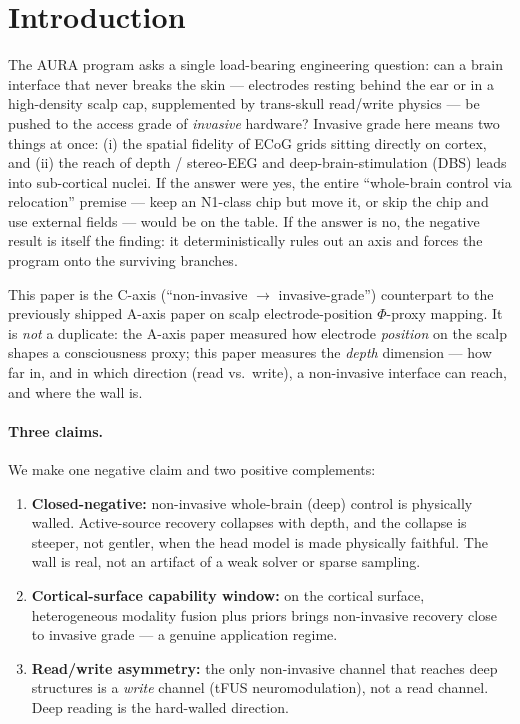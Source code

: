 \documentclass[11pt]{article}
\newcommand{\redbox}[1]{\textcolor{red!70!black}{\textbf{#1}}}
\newcommand{\greenbox}[1]{\textcolor{green!45!black}{\textbf{#1}}}
\begin{document}
\tableofcontents
\bigskip

\section{Introduction}
\label{sec:intro}

The AURA program asks a single load-bearing engineering question: can a brain
interface that never breaks the skin --- electrodes resting behind the ear or in a
high-density scalp cap, supplemented by trans-skull read/write physics --- be pushed
to the access grade of \emph{invasive} hardware? Invasive grade here means two
things at once: (i) the spatial fidelity of ECoG grids sitting directly on cortex,
and (ii) the reach of depth / stereo-EEG and deep-brain-stimulation (DBS) leads into
sub-cortical nuclei. If the answer were yes, the entire ``whole-brain control via
relocation'' premise --- keep an N1-class chip but move it, or skip the chip and use
external fields --- would be on the table. If the answer is no, the negative result
is itself the finding: it deterministically rules out an axis and forces the program
onto the surviving branches.

This paper is the C-axis (``non-invasive $\rightarrow$ invasive-grade'') counterpart
to the previously shipped A-axis paper on scalp electrode-position $\Phi$-proxy
mapping. It is \emph{not} a duplicate: the A-axis paper measured how electrode
\emph{position} on the scalp shapes a consciousness proxy; this paper measures the
\emph{depth} dimension --- how far in, and in which direction (read vs.\ write), a
non-invasive interface can reach, and where the wall is.

\paragraph{Three claims.} We make one negative claim and two positive complements:
\begin{enumerate}[leftmargin=2em]
  \item \redbox{Closed-negative:} non-invasive whole-brain (deep) control is
        physically walled. Active-source recovery collapses with depth, and the
        collapse is steeper, not gentler, when the head model is made physically
        faithful. The wall is real, not an artifact of a weak solver or sparse
        sampling.
  \item \greenbox{Cortical-surface capability window:} on the cortical surface,
        heterogeneous modality fusion plus priors brings non-invasive recovery
        close to invasive grade --- a genuine application regime.
  \item \textbf{Read/write asymmetry:} the only non-invasive channel that reaches
        deep structures is a \emph{write} channel (tFUS neuromodulation), not a read
        channel. Deep reading is the hard-walled direction.
\end{enumerate}
\end{document}
